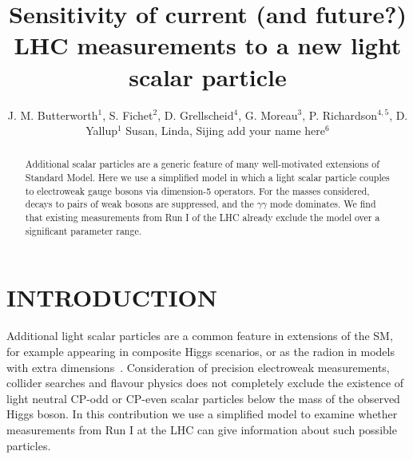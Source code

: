 \documentclass[11pt]{cernrep}
\begin{document}
\title{Sensitivity of current (and future?) LHC measurements to a new light scalar particle}

\author{
J. M. Butterworth$^1$, 
S. Fichet$^2$,
D. Grellscheid$^{4}$, 
G. Moreau$^3$,
P. Richardson$^{4,5}$, 
D. Yallup$^1$
Susan, Linda, Sijing add your name here$^6$
}

\maketitle

\begin{abstract}
Additional scalar particles are a generic feature of many well-motivated extensions of Standard Model. 
Here we use a simplified model in which a light scalar particle couples to electroweak gauge bosons via dimension-5 operators. For the masses considered, decays to pairs of weak bosons are suppressed,
and the $\gamma\gamma$ mode dominates. We find that existing measurements from Run I of the LHC already exclude the model over a significant parameter range. 

\end{abstract}

\section{INTRODUCTION}

Additional light scalar particles are a common feature in extensions of the SM, for example appearing in composite 
Higgs scenarios, or as the radion in models with extra dimensions~\cite{Angelescu:2017jyj}. 
Consideration of precision electroweak measurements, collider searches and flavour physics
does not completely exclude the existence of light neutral CP-odd or CP-even scalar particles below the mass of the 
observed Higgs boson\cite{Cacciapaglia:2016tlr}. In this contribution we use a simplified  model 
to examine whether measurements from Run I at the LHC can give information about such possible particles.
\end{document}
